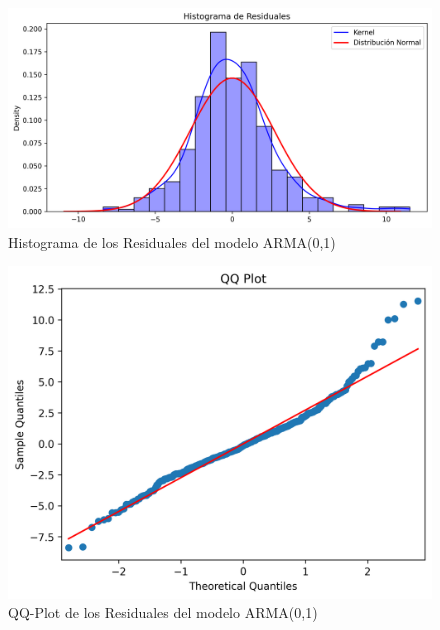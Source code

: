 \documentclass{article}
\theoremstyle{remark}
\theoremstyle{definition}
\begin{document}
\begin{enumerate}[label = \emph{\alph*})]
\begin{tcolorbox}[title=Soluci\'on 2.e]
            \begin{figure}[H]
                \centering
                \includegraphics[width=0.9\linewidth]{output/hist_resid.png}
                \caption{Histograma de los Residuales del modelo ARMA(0,1)}
                \label{fig:hist_resid}
            \end{figure}
            \begin{figure}[H]
                \centering
                \includegraphics[width=0.7\linewidth]{output/qq_plot_residuales.png}
                \caption{QQ-Plot de los Residuales del modelo ARMA(0,1)}
                \label{fig:qq_resid}
            \end{figure}


\end{tcolorbox}
\end{enumerate}
\end{document}

